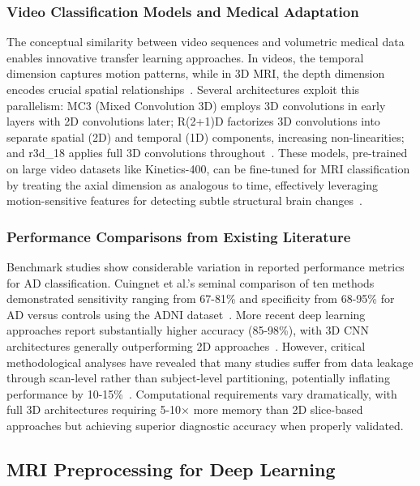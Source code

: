 \documentclass[12pt, a4paper]{article}
\begin{document}
\subsubsection{Video Classification Models and Medical Adaptation}

The conceptual similarity between video sequences and volumetric medical data enables innovative transfer learning approaches. In videos, the temporal dimension captures motion patterns, while in 3D MRI, the depth dimension encodes crucial spatial relationships~\cite{tran2018closer}. Several architectures exploit this parallelism: MC3 (Mixed Convolution 3D) employs 3D convolutions in early layers with 2D convolutions later; R(2+1)D factorizes 3D convolutions into separate spatial (2D) and temporal (1D) components, increasing non-linearities; and r3d\_18 applies full 3D convolutions throughout~\cite{ebrahimi2020introducing}. These models, pre-trained on large video datasets like Kinetics-400, can be fine-tuned for MRI classification by treating the axial dimension as analogous to time, effectively leveraging motion-sensitive features for detecting subtle structural brain changes~\cite{ebrahimi2020introducing, tran2018closer}.

\subsubsection{Performance Comparisons from Existing Literature}

Benchmark studies show considerable variation in reported performance metrics for AD classification. Cuingnet et al.'s seminal comparison of ten methods demonstrated sensitivity ranging from 67-81\% and specificity from 68-95\% for AD versus controls using the ADNI dataset~\cite{cuingnet2011automatic}. More recent deep learning approaches report substantially higher accuracy (85-98\%), with 3D CNN architectures generally outperforming 2D approaches~\cite{basaia2019automated, garg2023review}. However, critical methodological analyses have revealed that many studies suffer from data leakage through scan-level rather than subject-level partitioning, potentially inflating performance by 10-15\%~\cite{davatzikos2019machine}. Computational requirements vary dramatically, with full 3D architectures requiring 5-10× more memory than 2D slice-based approaches but achieving superior diagnostic accuracy when properly validated.

\subsection{MRI Preprocessing for Deep Learning}
\end{document}
